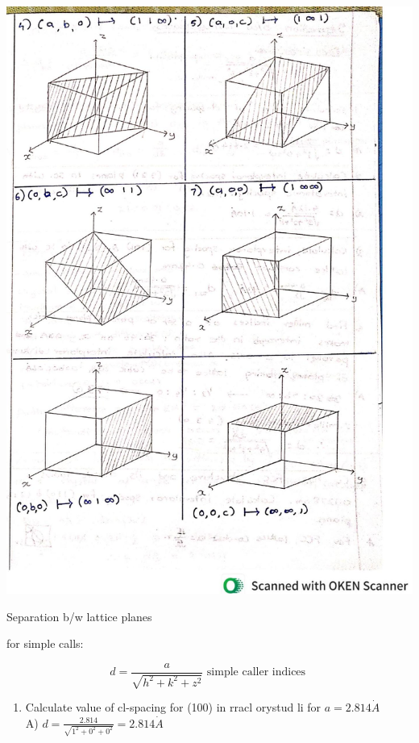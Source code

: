 \documentclass[10pt]{article}
\begin{document}
\begin{center}
\includegraphics[max width=\textwidth]{2024_06_16_30d750483617f1939202g-08}
\end{center}

Separation b/w lattice planes

for simple calls:

$$
d=\frac{a}{\sqrt{h^{2}+k^{2}+z^{2}}} \text { simple caller indices }
$$

\begin{enumerate}
  \item Calculate value of cl-spacing for (100) in rracl orystud li for $a=2.814 \dot{A}$\\
A) $d=\frac{2.814}{\sqrt{1^{2}+0^{2}+0^{2}}}=2.814 \dot{A}$
\end{enumerate}
\end{document}
